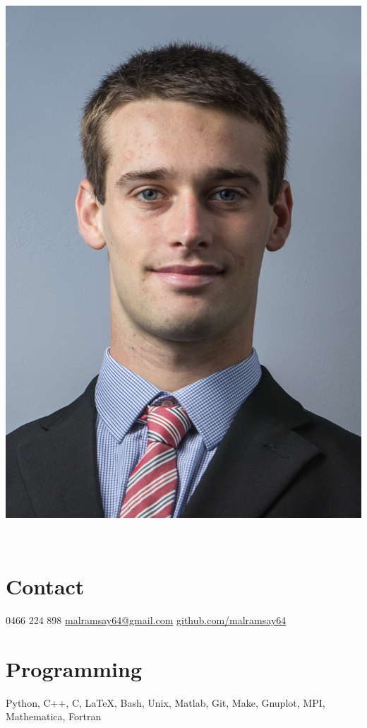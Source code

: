 \documentclass{friggeri-cv} %
\begin{document}


\begin{aside} %
\begin{flushleft}\includegraphics[width=\textwidth]{portrait}\\\end{flushleft}~
\section{Contact}
0466 224 898
\href{mailto:malramsay64@gmail.com}{malramsay64@gmail.com}
\href{github.com/malramsay64}{github.com/malramsay64}
\section{Programming}
Python, C++, C, \LaTeX,
Bash, Unix, Matlab, Git, 
Make, Gnuplot, MPI,
Mathematica, Fortran
\end{aside}
\end{document}

